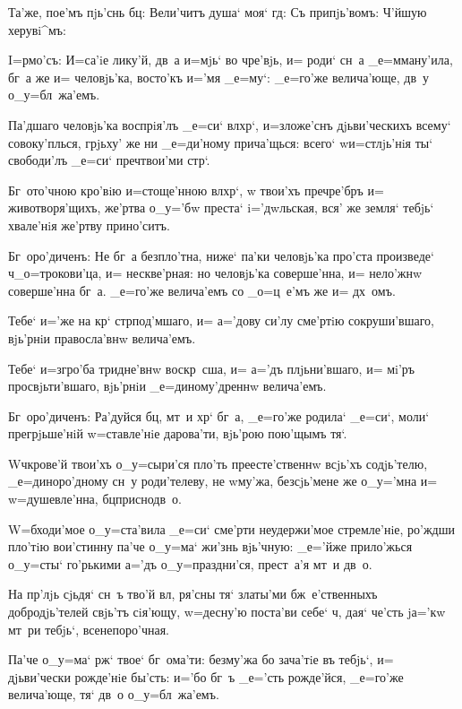 Та'же, пое'мъ пjь'снь бц: Вели'читъ душа` моя` 
гд: Съ припjь'вомъ: Ч'йшую херувi^мъ:


I=рмо'съ: И=са'iе лику'й, дв~а и=мjь` во чре'вjь, и= 
роди` сн~а _е=мману'ила, бг~а же и= человjь'ка, восто'къ 
и='мя _е=му`: _е=го'же велича'юще, дв~у о_у=бл~жа'емъ.

Па'дшаго человjь'ка воспрiя'лъ _е=си` вл хр`, 
и=з\ъ ложе'снъ дjьви'ческихъ всему` совоку'плься, грjьху' 
же ни _е=ди'ному прича'щься: всего` w\т и=стлjь'нiя ты` 
свободи'лъ _е=си` преч твои'ми стр`.

Бг~ото'чною кро'вiю и=стоще'нною вл хр`, w\т 
твои'хъ преч ре'бръ и= животворя'щихъ, же'ртва 
о_у='бw преста` i='дwльская, вся' же земля` тебjь` 
хвале'нiя же'ртву прино'ситъ.

Бг~оро'диченъ: Не бг~а безпло'тна, ниже` па'ки 
человjь'ка про'ста произведе` ч _о=трокови'ца, и= 
нескве'рная: но человjь'ка соверше'нна, и= нело'жнw 
соверше'нна бг~а. _е=го'же велича'емъ со _о=ц~е'мъ же и= 
дх~омъ. 


Тебе` и='же на кр` стр под'мшаго, и= 
а='дову си'лу сме'ртiю сокруши'вшаго, вjь'рнiи 
правосла'внw велича'емъ.

Тебе` и=з\ъ гро'ба тридне'внw воскр~сша, и= а='дъ 
плjьни'вшаго, и= мi'ръ просвjьти'вшаго, вjь'рнiи 
_е=диному'дреннw велича'емъ.

Бг~оро'диченъ: Ра'дуйся бц, мт~и хр` бг~а, 
_е=го'же родила` _е=си`, моли` прегрjьше'нiй w=ставле'нiе 
дарова'ти, вjь'рою пою'щымъ тя`. 


W\т ч крове'й твои'хъ о_у=сыри'ся пло'ть 
преесте'ственнw всjь'хъ содjь'телю, _е=диноро'дному сн~у 
роди'телеву, не w\т му'жа, без\ъ сjь'мене же о_у='мна и= 
w=душевле'нна, бц приснодв~о.

W=бходи'мое о_у=ста'вила _е=си` сме'рти неудержи'мое 
стремле'нiе, ро'ждши пло'тiю вои'стинну па'че о_у=ма` 
жи'знь вjь'чную: _е='йже прило'жься о_у=сты` го'рькими 
а='дъ о_у=праздни'ся, прест~а'я мт~и дв~о.

На пр'лjь сjьдя` сн~ъ тво'й вл, ря'сны тя` 
златы'ми бж~е'ственныхъ добродjь'телей свjь'тъ сiя'ющу, 
w=десну'ю поста'ви себе` ч, дая` че'сть jа='кw мт~ри 
тебjь`, всенепоро'чная.

Па'че о_у=ма` рж` твое` бг~ома'ти: без\ъ му'жа бо 
зача'тiе въ тебjь`, и= дjьви'чески рожде'нiе бы'сть: 
и='бо бг~ъ _е='сть рожде'йся, _е=го'же велича'юще, тя` 
дв~о о_у=бл~жа'емъ.

